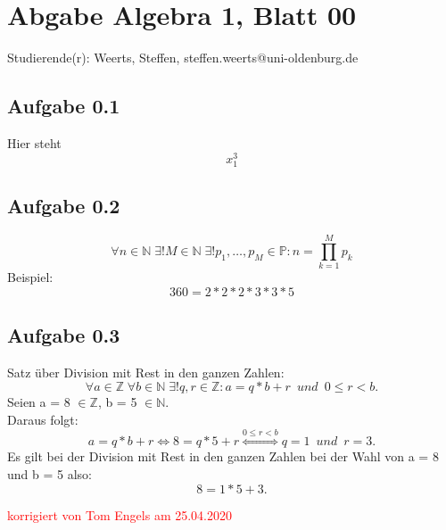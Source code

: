 \documentclass[12pt]{article}
\newcommand{\corr}[1]{\textcolor{red}{#1}}%
\begin{document}
\section*{Abgabe Algebra 1, Blatt 00}

Studierende(r): Weerts, Steffen, steffen.weerts@uni-oldenburg.de %

\subsection*{Aufgabe 0.1}
Hier steht $$x_1^3$$

\subsection*{Aufgabe 0.2}
$$\forall n \in \mathbb{N} \; \exists! M \in \mathbb{N} \; \exists! p_1, \ldots, p_M \in \mathbb{P}: n=\prod_{k=1}^{M}p_k$$
Beispiel:
$$360 = 2*2*2*3*3*5$$

\subsection*{Aufgabe 0.3}
Satz \"uber Division mit Rest in den ganzen Zahlen:
$$\forall a \in \mathbb{Z} \; \forall b \in \mathbb{N} \; \exists! q, r \in \mathbb{Z}: a=q*b+r \enspace und \enspace 0 \le r < b .$$
Seien a = 8 $\in \mathbb{Z}$, b = 5 $\in \mathbb{N}$.
\\ Daraus folgt: $$a = q*b+r \Longleftrightarrow 8 = q*5+r \overset{0 \le r < b}{\Longleftrightarrow} q=1 \enspace und \enspace r = 3.$$
Es gilt bei der Division mit Rest in den ganzen Zahlen bei der Wahl von a = 8 und b = 5 also: $$8 = 1*5+3.$$


\bigskip

\corr{korrigiert von Tom Engels am 25.04.2020}
\end{document}

